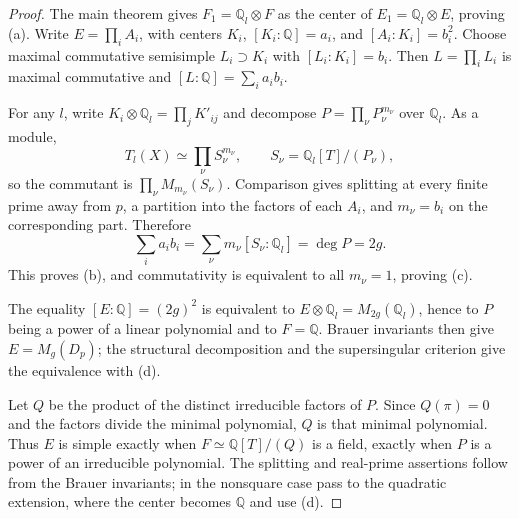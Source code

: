 \begin{proof}
The main theorem gives $F_1=\mathbb Q_l\otimes F$ as the center of
$E_1=\mathbb Q_l\otimes E$, proving (a). Write
$E=\prod_iA_i$, with centers $K_i$, $[K_i:\mathbb Q]=a_i$, and
$[A_i:K_i]=b_i^2$. Choose maximal commutative semisimple $L_i\supset K_i$
with $[L_i:K_i]=b_i$. Then $L=\prod_iL_i$ is maximal commutative and
$[L:\mathbb Q]=\sum_i a_ib_i$.

For any $l$, write $K_i\otimes\mathbb Q_l=\prod_jK'_{ij}$ and decompose
$P=\prod_\nu P_\nu^{m_\nu}$ over $\mathbb Q_l$. As a module,
\[
 T_l(X)\simeq\prod_\nu S_\nu^{m_\nu},\qquad
 S_\nu=\mathbb Q_l[T]/(P_\nu),
\]
so the commutant is $\prod_\nu M_{m_\nu}(S_\nu)$. Comparison gives splitting at
every finite prime away from $p$, a partition into the factors of each $A_i$,
and $m_\nu=b_i$ on the corresponding part. Therefore
\[
 \sum_i a_ib_i=\sum_\nu m_\nu[S_\nu:\mathbb Q_l]=\deg P=2g.
\]
This proves (b), and commutativity is equivalent to all $m_\nu=1$, proving (c).

The equality $[E:\mathbb Q]=(2g)^2$ is equivalent to
$E\otimes\mathbb Q_l=M_{2g}(\mathbb Q_l)$, hence to $P$ being a power of a
linear polynomial and to $F=\mathbb Q$. Brauer invariants then give
$E=M_g(D_p)$; the structural decomposition and the supersingular criterion
give the equivalence with (d).

Let $Q$ be the product of the distinct irreducible factors of $P$. Since
$Q(\pi)=0$ and the factors divide the minimal polynomial, $Q$ is that minimal
polynomial. Thus $E$ is simple exactly when $F\simeq\mathbb Q[T]/(Q)$ is a
field, exactly when $P$ is a power of an irreducible polynomial. The splitting
 and real-prime assertions follow from the Brauer invariants; in the nonsquare
 case pass to the quadratic extension, where the center becomes $\mathbb Q$ and
 use (d).

\end{proof}



